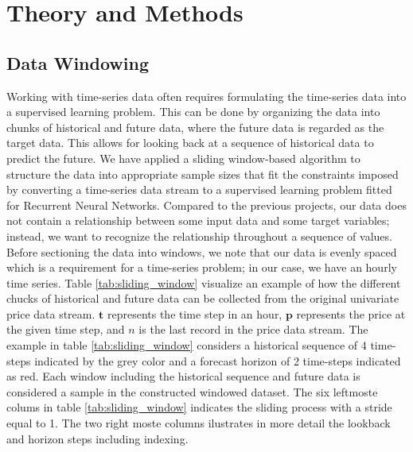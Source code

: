 \documentclass
[twocolumn,
secnumarabic,
nobibnotes,
aps,
prl,
reprint,
groupedaddress,
amsmath,
amssymb,
]{revtex4-2}
\begin{document}
\section{Theory and Methods}

\subsection{Data Windowing}
Working with time-series data often requires formulating the time-series data into a supervised learning problem. This can be done by organizing the data into chunks of historical and future data, where the future data is regarded as the target data. This allows for looking back at a sequence of historical data to predict the future. We have applied a sliding window-based algorithm to structure the data into appropriate sample sizes that fit the constraints imposed by converting a time-series data stream to a supervised learning problem fitted for Recurrent Neural Networks. Compared to the previous projects, our data does not contain a relationship between some input data and some target variables; instead, we want to recognize the relationship throughout a sequence of values. Before sectioning the data into windows, we note that our data is evenly spaced which is a requirement for a time-series problem; in our case, we have an hourly time series. Table \ref{tab:sliding_window} visualize an example of how the different chucks of historical and future data can be collected from the original univariate price data stream. $\mathbf{t}$ represents the time step in an hour, $\mathbf{p}$ represents the price at the given time step, and ${n}$ is the last record in the price data stream. The example in table \ref{tab:sliding_window} considers a historical sequence of 4 time-steps indicated by the grey color and a forecast horizon of 2 time-steps indicated as red. Each window including the historical sequence and future data is considered a sample in the constructed windowed dataset. The six leftmoste colums in table \ref{tab:sliding_window} indicates the sliding process with a stride equal to 1. The two right moste columns ilustrates in more detail the lookback and horizon steps including indexing. 
\end{document}
